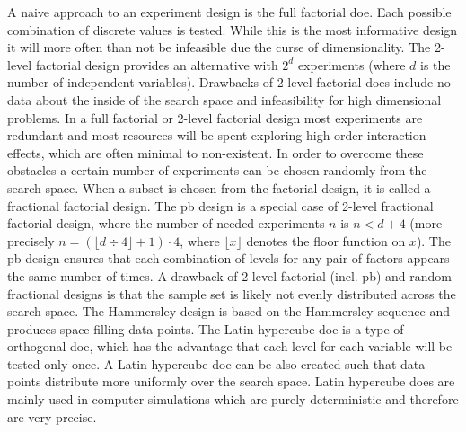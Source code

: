 A naive approach to an experiment design is the full factorial \gls{doe}.
Each possible combination of discrete values is tested. 
While this is the most informative design it will more often than not be infeasible due the curse of dimensionality\cite{cherkassky1998learning}.
The 2-level factorial design provides an alternative with $2^d$ experiments (where $d$ is the number of independent variables). 
Drawbacks of 2-level factorial \gls{doe}s include no data about the inside of the search space and infeasibility for high dimensional problems.
In a full factorial or 2-level factorial design most experiments are redundant and most resources will be spent exploring high-order interaction effects\cite{gunst2009fractional}, which are often minimal to non-existent.
In order to overcome these obstacles a certain number of experiments can be chosen randomly from the search space. 
%
When a subset is chosen from the factorial design, it is called a fractional factorial design. 
%
%
The \gls{pb}\cite{vanaja2007design,miller2001using,wang1995hidden} design is a special case of 2-level fractional factorial design, 
where the number of needed experiments $n$ is $n<d+4$ 
(more precisely $n=(\lfloor d\div4\rfloor+1)\cdot4$, where $\lfloor x\rfloor$ denotes the floor function on $x$).
The \gls{pb} design ensures that each combination of levels for any pair of factors appears the same number of times. 
A drawback of 2-level factorial (incl. \gls{pb}) and random fractional designs is that the sample set is likely not evenly distributed across the search space\cite{viana2016tutorial}. 
The Hammersley design\cite{viana2016tutorial,diwekar1997efficient} is based on the Hammersley sequence and produces space filling data points. 
The Latin hypercube \gls{doe}\cite{viana2016tutorial,diwekar1997efficient} is a type of orthogonal \gls{doe}, 
which has the advantage that each level for each variable will be tested only once. 
A Latin hypercube \gls{doe} can be also created such that data points distribute more uniformly over the search space. 
Latin hypercube \gls{doe}s are mainly used in computer simulations which are purely deterministic and therefore are very precise.
%
\iffalse
%

